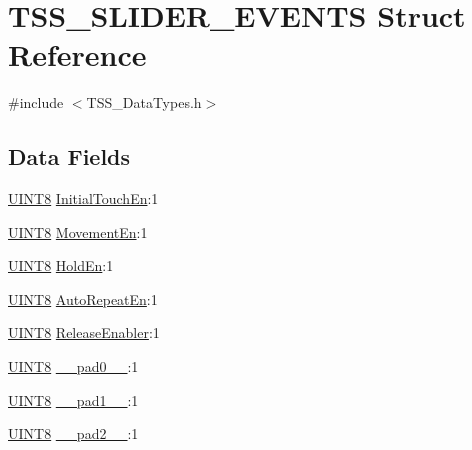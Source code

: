 \hypertarget{struct_t_s_s___s_l_i_d_e_r___e_v_e_n_t_s}{}\section{T\+S\+S\+\_\+\+S\+L\+I\+D\+E\+R\+\_\+\+E\+V\+E\+N\+TS Struct Reference}
\label{struct_t_s_s___s_l_i_d_e_r___e_v_e_n_t_s}


{\ttfamily \#include $<$T\+S\+S\+\_\+\+Data\+Types.\+h$>$}

\subsection*{Data Fields}
\begin{DoxyCompactItemize}
\item 
\hyperlink{_t_s_s___data_types_8h_ab27e9918b538ce9d8ca692479b375b6a}{U\+I\+N\+T8} \hyperlink{struct_t_s_s___s_l_i_d_e_r___e_v_e_n_t_s_af1478c480c5f9ff2589d8e687ad1ade4}{Initial\+Touch\+En}\+:1
\item 
\hyperlink{_t_s_s___data_types_8h_ab27e9918b538ce9d8ca692479b375b6a}{U\+I\+N\+T8} \hyperlink{struct_t_s_s___s_l_i_d_e_r___e_v_e_n_t_s_a7011ab8c0efec25677b2287c886370d0}{Movement\+En}\+:1
\item 
\hyperlink{_t_s_s___data_types_8h_ab27e9918b538ce9d8ca692479b375b6a}{U\+I\+N\+T8} \hyperlink{struct_t_s_s___s_l_i_d_e_r___e_v_e_n_t_s_a3cd1f8b7d5809d5a12f9a7d5b3b780e7}{Hold\+En}\+:1
\item 
\hyperlink{_t_s_s___data_types_8h_ab27e9918b538ce9d8ca692479b375b6a}{U\+I\+N\+T8} \hyperlink{struct_t_s_s___s_l_i_d_e_r___e_v_e_n_t_s_a714a49a3965b0bb1a5187fb6079f51e3}{Auto\+Repeat\+En}\+:1
\item 
\hyperlink{_t_s_s___data_types_8h_ab27e9918b538ce9d8ca692479b375b6a}{U\+I\+N\+T8} \hyperlink{struct_t_s_s___s_l_i_d_e_r___e_v_e_n_t_s_a7f5f3751fee0f5a199948ffb87697255}{Release\+Enabler}\+:1
\item 
\hyperlink{_t_s_s___data_types_8h_ab27e9918b538ce9d8ca692479b375b6a}{U\+I\+N\+T8} \hyperlink{struct_t_s_s___s_l_i_d_e_r___e_v_e_n_t_s_a2ee36fe5d196fb00b71d0929ff19fe04}{\+\_\+\+\_\+pad0\+\_\+\+\_\+}\+:1
\item 
\hyperlink{_t_s_s___data_types_8h_ab27e9918b538ce9d8ca692479b375b6a}{U\+I\+N\+T8} \hyperlink{struct_t_s_s___s_l_i_d_e_r___e_v_e_n_t_s_a0eafaa7e9e186548dc46e1de54292c9a}{\+\_\+\+\_\+pad1\+\_\+\+\_\+}\+:1
\item 
\hyperlink{_t_s_s___data_types_8h_ab27e9918b538ce9d8ca692479b375b6a}{U\+I\+N\+T8} \hyperlink{struct_t_s_s___s_l_i_d_e_r___e_v_e_n_t_s_ad558724ee7a063e9dc0fb2bd0b8f6635}{\+\_\+\+\_\+pad2\+\_\+\+\_\+}\+:1
\end{DoxyCompactItemize}



